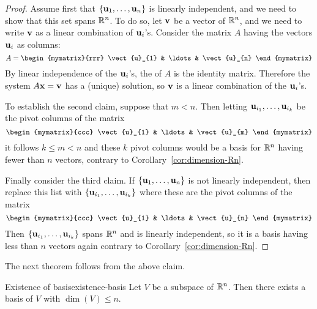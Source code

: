 \begin{proof}
  Assume first that $\left\{\mbox{\bf u}_{1},\ldots ,\mbox{\bf u}_{n}\right\} $ is
  linearly independent, and we need to show that this set spans
  $\mathbb{R}^{n}$. To do so, let $\mbox{\bf v}$ be a vector of\/ $\mathbb{R}^{n}$, and we
  need to write $\mbox{\bf v}$ as a linear combination of $\mbox{\bf u}_i$'s.
  Consider the matrix $A$ having the vectors $\mbox{\bf u}_i$ as columns:
  \begin{equation*}
    A = 
    \begin{mymatrix}{rrr}
      \vect{u}_{1} & \ldots & \vect{u}_{n} 
    \end{mymatrix}
  \end{equation*}
  By linear independence of the $\mbox{\bf u}_i$'s, the {\rref} of $A$ is
  the identity matrix.  Therefore the system $A\mbox{\bf x}= \mbox{\bf v}$ has
  a (unique) solution, so $\mbox{\bf v}$ is a linear combination of the
  $\mbox{\bf u}_i$'s.

  To establish the second claim, suppose that $m<n$. Then letting
  $\mbox{\bf u}_{i_{1}},\ldots ,\mbox{\bf u}_{i_{k}}$ be the pivot columns of
  the matrix
  \begin{equation*}
    \begin{mymatrix}{ccc}
      \vect{u}_{1} & \ldots & \vect{u}_{m}
    \end{mymatrix}
  \end{equation*}
  it follows $k\leq m<n$ and these $k$ pivot columns would be a basis
  for $\mathbb{R}^{n}$ having fewer than $n$ vectors, contrary to
  Corollary~\ref{cor:dimension-Rn}.

  Finally consider the third claim. If $\left\{\mbox{\bf u}_{1},\ldots
    ,\mbox{\bf u}_{n}\right\} $ is not linearly independent, then replace this
  list with $\left\{\mbox{\bf u}_{i_{1}},\ldots ,\mbox{\bf u}_{i_{k}}\right\} $ where these
  are the pivot columns of the matrix 
  \begin{equation*}
    \begin{mymatrix}{ccc}
      \vect{u}_{1} & \ldots & \vect{u}_{n}
    \end{mymatrix}
  \end{equation*}
  Then $\left\{\mbox{\bf u}_{i_{1}},\ldots ,\mbox{\bf u}_{i_{k}}\right\} $ spans
  $\mathbb{R}^{n}$ and is linearly independent, so it is a basis having
  less than $n$ vectors again contrary to Corollary~\ref{cor:dimension-Rn}.
\end{proof}

The next theorem follows from the above claim.

\begin{theorem}{Existence of basis}{existence-basis}
  Let $V$ be a subspace of\/ $\mathbb{R}^n$. Then there exists a basis of $V$ with 
  $\dim(V)\leq n$.
\end{theorem}

